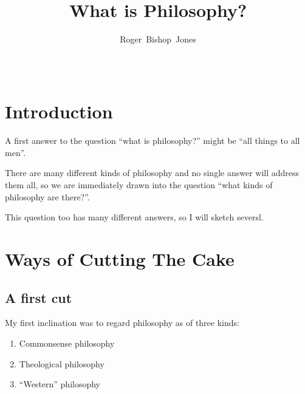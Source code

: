 \documentclass[10pt,titlepage]{article}
\title{What is Philosophy?}
\author{Roger~Bishop~Jones}
\date{\ }
\newcommand{\ignore}[1]{}
\begin{document}
                               
\begin{titlepage}
\maketitle

\ignore{
\vfill

\begin{abstract}

\end{abstract}

\begin{centering}

{\footnotesize

\copyright\ Roger~Bishop~Jones;
}%

\end{centering}
}%

\end{titlepage}

\setcounter{tocdepth}{2}
{\parskip-0pt\tableofcontents}



\section{Introduction}

A first answer to the question ``what is philosophy?'' might be ``all things to all men''.

There are many different kinds of philosophy and no single answer will address them all, so we are immediately drawn into the question ``what kinds of philosophy are there?''.

This question too has many different answers, so I will sketch seversl.

\section{Ways of Cutting The Cake}

\subsection{A first cut}

My first inclination was to regard philosophy as of three kinds:

\begin{enumerate}
\item Commonsense philosophy
\item Theological philosophy
\item ``Western'' philosophy
\end{enumerate}
\end{document}
